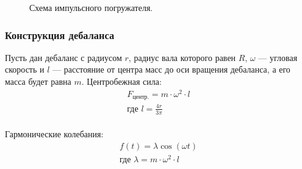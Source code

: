 \documentclass[10pt, pdf, hyperref={unicode}]{beamer}
\begin{document}
\begin{frame}
\begin{center}
\begin{minipage}[h]{0.97\linewidth}
\begin{minipage}[h]{0.36\linewidth}
\begin{figure}[h]
                        \caption{Схема импульсного погружателя.}
                    \end{figure}
                \end{minipage}
            \end{minipage}
        \end{center}
    \end{frame}


    \begin{frame}
        \frametitle{Конструкция дебаланса}
        \begin{center}
            \begin{minipage}[h]{0.97\linewidth}
                \begin{minipage}[h]{0.6\linewidth}
                    Пусть дан  дебаланс с радиусом $r$, радиус вала которого равен $R$,
                    $\omega$ --- угловая скорость и $l$ --- расстояние от центра масс до оси вращения дебаланса, а его масса будет равна $m$.
                    Центробежная сила:
                    \begin{equation}
                        \begin{gathered}
                            F_{\textrm{центр.}} = m \cdot \omega^2 \cdot l \\
                            \textrm{где } l = \frac{4 r}{3 \pi}
                        \end{gathered}
                    \end{equation}
                    \\
                    Гармонические колебания:
                    \begin{equation}
                        \begin{gathered}
                            f(t) = \lambda \cos (\omega t) \\
                            \textrm{где } \lambda = m \cdot \omega^2 \cdot l
                        \end{gathered}
                    \end{equation}
                \end{minipage}
                \hfill
                \begin{minipage}[h]{0.36\linewidth}
                    \begin{figure}[h]
                        \centering

\end{figure}
\end{minipage}
\end{minipage}
\end{center}
\end{frame}
\end{document}
